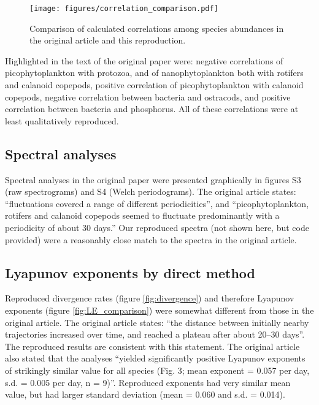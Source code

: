 \documentclass[10pt,a4paper,onecolumn]{article}
\renewcommand{\includegraphics}[2][]{\OldIncludegraphics[width=12cm, #1]{#2}}
\begin{document}
\begin{figure}[htbp]
\centering
\texttt{[image: figures/correlation\_comparison.pdf]}
\caption{\label{fig:corr_comp}Comparison of calculated correlations
among species abundances in the original article and this reproduction.}
\end{figure}

Highlighted in the text of the original paper were: negative
correlations of picophytoplankton with protozoa, and of
nanophytoplankton both with rotifers and calanoid copepods, positive
correlation of picophytoplankton with calanoid copepods, negative
correlation between bacteria and ostracods, and positive correlation
between bacteria and phosphorus. All of these correlations were at least
qualitatively reproduced.

\subsection{Spectral analyses}\label{spectral-analyses}

Spectral analyses in the original paper were presented graphically in
figures S3 (raw spectrograms) and S4 (Welch periodograms). The original
article states: ``fluctuations covered a range of different
periodicities'', and ``picophytoplankton, rotifers and calanoid copepods
seemed to fluctuate predominantly with a periodicity of about 30 days.''
Our reproduced spectra (not shown here, but code provided) were a
reasonably close match to the spectra in the original article.

\subsection{Lyapunov exponents by direct
method}\label{lyapunov-exponents-by-direct-method}

Reproduced divergence rates (figure \ref{fig:divergence}) and therefore
Lyapunov exponents (figure \ref{fig:LE_comparison}) were somewhat
different from those in the original article. The original article
states: ``the distance between initially nearby trajectories increased
over time, and reached a plateau after about 20--30 days''. The
reproduced results are consistent with this statement. The original
article also stated that the analyses ``yielded significantly positive
Lyapunov exponents of strikingly similar value for all species (Fig. 3;
mean exponent = 0.057 per day, s.d. = 0.005 per day, n = 9)''.
Reproduced exponents had very similar mean value, but had larger
standard deviation (mean = 0.060 and s.d. = 0.014).
\end{document}
